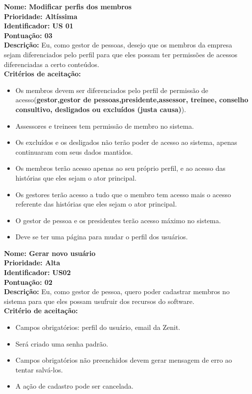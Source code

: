\begin{anexosenv}
\textbf{Nome: Modificar perfis dos membros\\
Prioridade: Altíssima\\
Identificador: US 01\\
Pontuação: 03\\
Descrição:} Eu, como gestor de pessoas, desejo que os membros da empresa sejam diferenciados pelo perfil para que eles possam ter permissões de acessos diferenciadas a certo conteúdos.\\
\textbf{Critérios de aceitação:}
\begin{itemize}
    \item Os membros devem ser diferenciados pelo perfil de permissão de acesso(\textbf{gestor,gestor de pessoas,presidente,assessor, treinee, conselho consultivo, desligados ou excluídos (justa causa)}).
    \item Assessores e treinees tem permissão de membro no sistema.
    \item Os excluídos e os desligados não terão poder de acesso ao sistema, apenas continuaram com seus dados mantidos.
    \item Os membros terão acesso apenas ao seu próprio perfil, e ao acesso das histórias que eles sejam o ator principal.
    \item Os gestores terão acesso a tudo que o membro tem acesso mais o acesso referente das histórias que eles sejam o ator principal.
    \item O gestor de pessoa e os presidentes terão acesso máximo no sistema.
    \item Deve se ter uma página para mudar o perfil dos usuários.
\end{itemize}

\textbf{Nome: Gerar novo usuário\\
Prioridade: Alta\\
Identificador: US02\\
Pontuação: 02\\
Descrição: }Eu, como gestor de pessoa, quero poder cadastrar membros no sistema para que eles possam usufruir dos recursos do software.\\
\textbf{Critério de aceitação:}
\begin{itemize}
    \item Campos obrigatórios: perfil do usuário, email da Zenit.
    \item Será criado uma senha padrão.
    \item Campos obrigatórios não preenchidos devem gerar mensagem de erro ao tentar salvá-los.
    \item A ação de cadastro pode ser cancelada.
\end{itemize}



\end{anexosenv}
